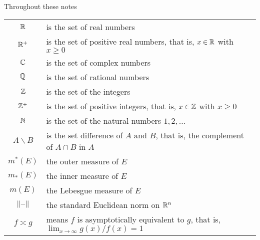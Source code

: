 Throughout these notes

\begin{tabular}{cl}
  $\mathbb{R}$ & is the set of real numbers\\
  $\mathbb{R}^+$ & is the set of positive real numbers, that is, $x\in\mathbb{R}$ with
             $x\geq 0$\\
  $\mathbb{C}$ & is the set of complex numbers\\
  $\mathbb{Q}$ & is the set of rational numbers\\
  $\mathbb{Z}$ & is the set of the integers\\
  $\mathbb{Z}^+$ & is the set of positive integers, that is, $x\in\mathbb{Z}$ with
             $x\geq 0$\\
  $\mathbb{N}$ & is the set of the natural numbers $1,2,\ldots$\\
  $A\smallsetminus B$ & is the set difference of $A$ and $B$, that is, the
                        complement of $A\cap B$ in $A$\\
  $m^*(E)$ & the outer measure of $E$\\
  $m_*(E)$ & the inner measure of $E$\\
  $m(E)$ & the Lebesgue measure of $E$\\
  $\|{-}\|$ & the standard Euclidean norm on $\mathbb{R}^n$\\
  $f\asymp g$ & means $f$ is asymptotically equivalent to $g$, that is,
                $\lim_{x\to\infty} g(x)/f(x)=1$\\
\end{tabular}

\newpage

